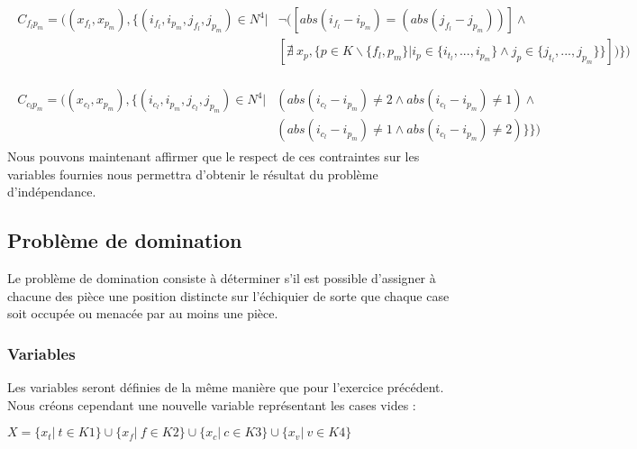 \documentclass[a4paper]{article}
\begin{document}
\begin{align*}
\begin{split}
C_{f_lp_m} = ( (x_{f_l},x_{p_m}), \{ (i_{f_l},i_{p_m},j_{f_l},j_{p_m}) \in N^4 | & \neg( [ abs(i_{f_l} - i_{p_m}) = (abs(j_{f_l} - j_{p_m})) ]\wedge \\
& [ \nexists \ x_p, \{ p \in K \backslash \{f_l,p_m\} | i_{p} \in \{ i_{t_l},...,i_{p_m} \} \wedge j_p \in \{ j_{t_l},...,j_{p_m} \}\}  ] ) \} )
\end{split}
\end{align*}

\begin{align*}
\begin{split}
C_{c_lp_m} = ( (x_{c_l},x_{p_m}), \{ (i_{c_l},i_{p_m},j_{c_l},j_{p_m}) \in N^4 |& (abs(i_{c_l} - i_{p_m}) \neq 2 \wedge abs(i_{c_l} - i_{p_m}) \neq 1) \wedge \\
& (abs(i_{c_l} - i_{p_m}) \neq 1 \wedge abs(i_{c_l} - i_{p_m}) \neq 2)\} \} )
\end{split}
\end{align*}
Nous pouvons maintenant affirmer que le respect de ces contraintes sur les variables fournies nous permettra d'obtenir le résultat du problème d'indépendance. 

\subsection{Problème de domination}
Le problème de domination consiste à déterminer s’il est possible d’assigner à chacune des pièce une position distincte sur l'échiquier de sorte que chaque case soit occupée ou menacée par au moins une pièce.

\begin{center}
\end{center}

\subsubsection{Variables}
Les variables seront définies de la même manière que pour l'exercice précédent. Nous créons cependant une nouvelle variable représentant les cases vides : 
\begin{center}
$X = \{ x_t | \ t \in K1 \}  \cup \{ x_f | \ f \in K2 \} \cup \{ x_c | \ c \in K3 \} \cup \{ x_v | \ v \in K4 \}$
\end{center}
\end{document}
